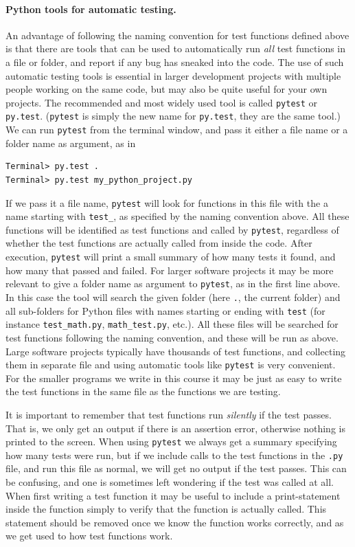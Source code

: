 \documentclass[graybox,envcountchap,sectrefs,final]{svmonodo}
\begin{document}
\paragraph{Python tools for automatic testing.}
An advantage of following the naming convention for test functions defined above is that there
are tools that can be used to automatically run \emph{all} test functions in a file or folder, and
report if any bug has sneaked into the code. The use of such automatic testing tools is essential in
larger development projects with multiple people working on the same code, but may also be quite useful
for your own projects. The recommended and most widely used tool is called \texttt{pytest} or \texttt{py.test}.
(\texttt{pytest} is simply the new name for \texttt{py.test}, they are the same tool.)
We can run \texttt{pytest} from the terminal window, and pass it either a file name or a folder name
as argument, as in
\begin{Verbatim}[frame=lines,label=\fbox{{\tiny Terminal}},framesep=2.5mm,framerule=0.7pt]
Terminal> py.test .
Terminal> py.test my_python_project.py
\end{Verbatim}
If we pass it a file name, \texttt{pytest} will look for functions in this file with the a name starting with \Verb!test_!, as specified by
the naming convention above. All these functions will be identified as test functions and called by \texttt{pytest}, regardless of
whether the test functions are actually called from inside the code. After execution, \texttt{pytest} will print a small summary of how
many tests it found, and how many that passed and failed. For larger software projects it may be more relevant to give a folder
name as argument to \texttt{pytest}, as in the first line above. In this case the tool will search the given folder (here \texttt{.}, the
current folder) and all sub-folders for Python files with names starting or ending with \texttt{test}
(for instance \Verb!test_math.py!, \Verb!math_test.py!, etc.). All these files will be searched for test functions following the
naming convention, and these will be run as above. Large software projects typically have thousands of test functions, and
collecting them in separate file and using automatic tools like \texttt{pytest} is very convenient. For the smaller programs we
write in this course it may be just as easy to write the test functions in the same file as the functions we are testing.

It is important to remember that test functions run \emph{silently} if the test passes. That is, we only get an output if
there is an assertion error, otherwise nothing is printed to the screen. When using \texttt{pytest} we always get a
summary specifying how many tests were run, but if we include calls to the test functions in the \texttt{.py} file, and
run this file as normal, we will get no output if the test passes. This can be confusing, and one is sometimes left wondering
if the test was called at all. When first writing a test function it may be useful to include a print-statement inside the
function simply to verify that the function
is actually called. This statement should be removed once we know the function works correctly,
and as we get used to how test functions work.
\end{document}
